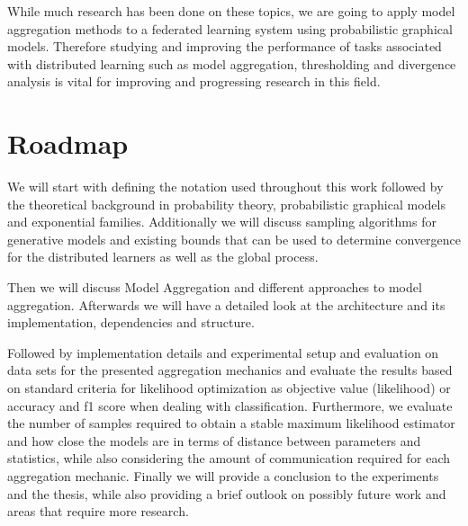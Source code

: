 While much research has been done on these topics, we are going to apply model aggregation methods to a federated learning system using probabilistic graphical models.
Therefore studying and improving the performance of tasks associated with distributed learning such as model aggregation, thresholding and divergence analysis is vital for improving and progressing research in this field.

\section{Roadmap}

We will start with defining the notation used throughout this work followed by the theoretical background in probability theory, probabilistic graphical models and exponential families.
Additionally we will discuss sampling algorithms for generative models and existing bounds that can be used to determine convergence for the distributed learners as well as the global process.

Then we will discuss Model Aggregation and different approaches to model aggregation. 
Afterwards we will have a detailed look at the architecture and its implementation, dependencies and structure.

Followed by implementation details and experimental setup and evaluation on data sets for the presented aggregation mechanics and evaluate the results based on standard criteria for likelihood optimization as objective value (likelihood) or accuracy and f1 score when dealing with classification. 
Furthermore, we evaluate the number of samples required to obtain a stable maximum likelihood estimator and how close the models are in terms of distance between parameters and statistics, while also considering the amount of communication required for each aggregation mechanic.
Finally we will provide a conclusion to the experiments and the thesis, while also providing a brief outlook on possibly future work and areas that require more research.
